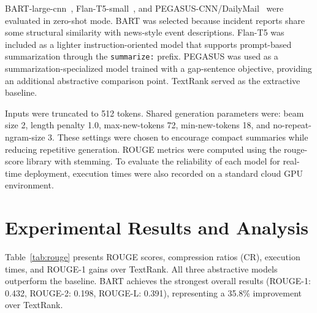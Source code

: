 \documentclass[10pt,conference]{IEEEtran}
\begin{document}
BART-large-cnn~\cite{lewis2020}, Flan-T5-small~\cite{raffel2020}, and
PEGASUS-CNN/DailyMail~\cite{zhang2020} were evaluated in zero-shot mode.
BART was selected because incident reports share some structural
similarity with news-style event descriptions. Flan-T5 was included as a
lighter instruction-oriented model that supports prompt-based
summarization through the \texttt{summarize:} prefix. PEGASUS was used as
a summarization-specialized model trained with a gap-sentence objective,
providing an additional abstractive comparison point. TextRank served as
the extractive baseline.

Inputs were truncated to 512 tokens. Shared generation parameters were:
beam size 2, length penalty 1.0, max-new-tokens 72, min-new-tokens 18,
and no-repeat-ngram-size 3. These settings were chosen to encourage
compact summaries while reducing repetitive generation. ROUGE metrics
were computed using the rouge-score library with stemming. To evaluate the reliability of each model for real-time deployment, execution times were also recorded on a standard cloud GPU environment.

\section{Experimental Results and Analysis}
\vspace{-1mm}

Table~\ref{tab:rouge} presents ROUGE scores, compression ratios (CR),
execution times, and ROUGE-1 gains over TextRank. All three abstractive models outperform
the baseline. BART achieves the strongest overall results
(ROUGE-1: 0.432, ROUGE-2: 0.198, ROUGE-L: 0.391), representing a 35.8\%
improvement over TextRank.
\end{document}
